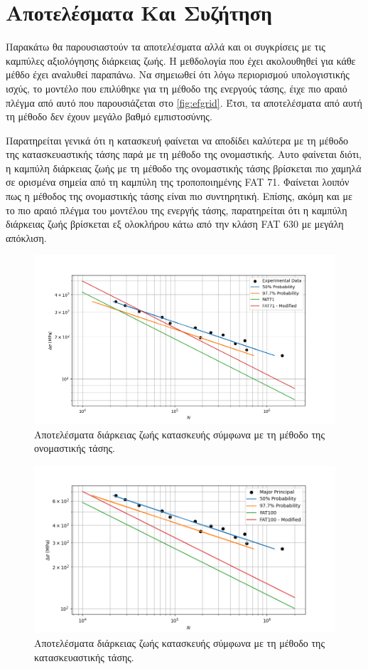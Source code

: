 \documentclass{article}
\begin{document}
\section{Αποτελέσματα Και Συζήτηση}
Παρακάτω θα παρουσιαστούν τα αποτελέσματα αλλά και οι συγκρίσεις με τις καμπύλες αξιολόγησης διάρκειας ζωής. Η μεθδολογία που έχει ακολουθηθεί για κάθε μέθδο έχει αναλυθεί παραπάνω. Να σημειωθεί ότι λόγω περιορισμού υπολογιστικής ισχύς, το μοντέλο που επιλύθηκε για τη μέθοδο της ενεργούς τάσης, έιχε πιο αραιό πλέγμα από αυτό που παρουσιάζεται στο \ref{fig:efgrid}. Έτσι, τα αποτελέσματα από αυτή τη μέθοδο δεν έχουν μεγάλο βαθμό εμπιστοσύνης.
\par Παρατηρείται γενικά ότι η κατασκευή φαίνεται να αποδίδει καλύτερα με τη μέθοδο της κατασκευαστικής τάσης παρά με τη μέθοδο της ονομαστικής. Αυτο φαίνεται διότι, η καμπύλη διάρκειας ζωής με τη μέθοδο της ονομαστικής τάσης βρίσκεται πιο χαμηλά σε ορισμένα σημεία από τη καμπύλη της τροποποιημένης FAT 71. Φαίνεται λοιπόν πως η μέθοδος της ονομαστικής τάσης είναι πιο συντηρητική. Επίσης, ακόμη και με το πιο αραιό πλέγμα του μοντέλου της ενεργής τάσης, παρατηρείται ότι η καμπύλη διάρκειας ζωής βρίσκεται εξ ολοκλήρου κάτω από την κλάση FAT 630 με μεγάλη απόκλιση.

\begin{figure}[H]
    \centering
    \includegraphics[width = 0.8\linewidth]{media/nominal.png}
    \caption{Αποτελέσματα διάρκειας ζωής κατασκευής σύμφωνα με τη μέθοδο της ονομαστικής τάσης.}
    \label{fig:nomr}
\end{figure}
\begin{figure}[H]
    \centering
    \includegraphics[width = 0.8\linewidth]{media/shs.png}
    \caption{Αποτελέσματα διάρκειας ζωής κατασκευής σύμφωνα με τη μέθοδο της κατασκευαστικής τάσης.}
    \label{fig:shsr}
\end{figure}
\end{document}
